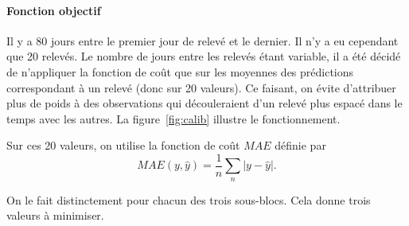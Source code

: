 \documentclass[a4paper, 11pt]{article}
\begin{document}
\paragraph{Fonction objectif}Il y a 80 jours entre le premier jour de relevé et le dernier. Il n'y a eu cependant que 20 relevés. Le nombre de jours entre les relevés étant variable, il a été décidé de n'appliquer la fonction de coût que sur les moyennes des prédictions correspondant à un relevé (donc sur 20 valeurs). Ce faisant, on évite d'attribuer plus de poids à des observations qui découleraient d'un relevé plus espacé dans le temps avec les autres. La figure~\ref{fig:calib} illustre le fonctionnement.

Sur ces 20 valeurs, on utilise la fonction de coût $MAE$ définie par
$$
MAE(y, \hat y) = \frac{1}{n}\sum_n | y - \hat y |.
$$

On le fait distinctement pour chacun des trois sous-blocs. Cela donne trois valeurs à minimiser.
\end{document}
